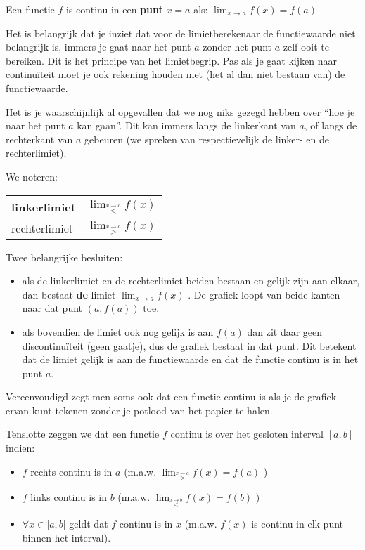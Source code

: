 Een functie $f$ is continu in een \textbf{punt} $x=a$ als: ${\displaystyle \lim_{x\to a}}f(x)=f(a)$

\noindent Het is belangrijk dat je inziet dat voor de limietberekenaar
de functiewaarde niet belangrijk is, immers je gaat naar het punt
$a$ zonder het punt $a$ zelf ooit te bereiken. Dit is het principe
van het limietbegrip. Pas als je gaat kijken naar continu\"iteit moet
je ook rekening houden met (het al dan niet bestaan van) de functiewaarde.

\noindent \medskip{}


\noindent Het is je waarschijnlijk al opgevallen dat we nog niks gezegd
hebben over ``hoe je naar het punt $a$ kan gaan''. Dit kan immers
langs de linkerkant van $a$, of langs de rechterkant van $a$ gebeuren
(we spreken van respectievelijk de linker- en de rechterlimiet).

\noindent \medskip{}


\noindent We noteren: %
\begin{tabular}{|l|l|}
\hline 
linkerlimiet & ${\displaystyle \lim_{\overset{x\rightarrow a}{<}}}f(x)$\\
\hline 
rechterlimiet & ${\displaystyle \lim_{\overset{x\rightarrow a}{>}}}f(x)$\\
\hline 
\end{tabular}

\noindent \medskip{}


\noindent Twee belangrijke besluiten:
\begin{itemize}
\item als de linkerlimiet en de rechterlimiet beiden bestaan en gelijk zijn
aan elkaar, dan bestaat \textbf{de} limiet ${\displaystyle \lim_{x\to a}}f(x)$
. De grafiek loopt van beide kanten naar dat punt $(a,f(a))$ toe.
\item als bovendien de limiet ook nog gelijk is aan $f(a)$ dan zit daar
geen discontinu\"iteit (geen gaatje), dus de grafiek bestaat in dat
punt. Dit betekent dat de limiet gelijk is aan de functiewaarde en
dat de functie continu is in het punt $a$.
\end{itemize}
\noindent Vereenvoudigd zegt men soms ook dat een functie continu
is als je de grafiek ervan kunt tekenen zonder je potlood van het
papier te halen.

\medskip{}


\noindent Tenslotte zeggen we dat een functie $f$ continu is over
het gesloten interval $[a,b]$ indien:
\begin{itemize}
\item $f$ rechts continu is in $a$ (m.a.w. ${\displaystyle \lim_{\overset{x\rightarrow a}{>}}}f(x)=f(a)$
)
\item $f$ links continu is in $b$ (m.a.w. ${\displaystyle \lim_{\overset{x\rightarrow b}{<}}}f(x)=f(b)$
)
\item $\forall x\in]a,b[$ geldt dat $f$ continu is in $x$ (m.a.w. $f(x)$
is continu in elk punt binnen het interval).
\end{itemize}
\medskip{}


